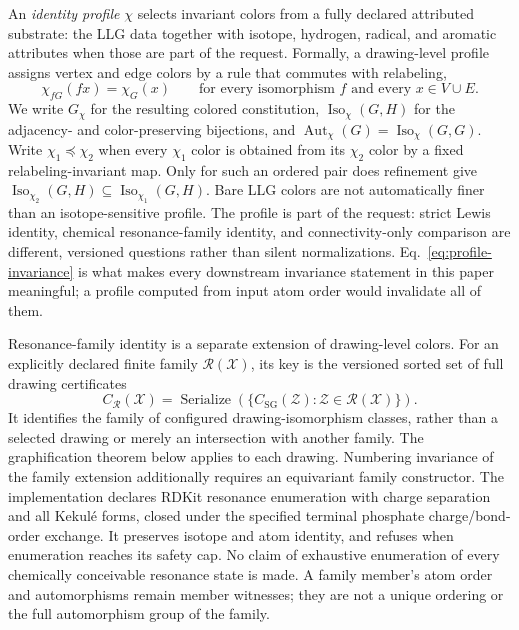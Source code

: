 \documentclass[pdflatex,sn-mathphys-num,referee,lineno]{sn-jnl}
\theoremstyle{plain}
\theoremstyle{remark}
\theoremstyle{definition}
\begin{document}
An \emph{identity profile} \(\chi\) selects invariant colors from a fully
declared attributed substrate: the LLG data together with isotope, hydrogen,
radical, and aromatic attributes when those are part of the request.  Formally,
a drawing-level profile assigns vertex and edge colors by a rule that commutes
with relabeling,
\begin{equation}
  \chi_{fG}(f x)=\chi_G(x)
  \qquad\text{for every isomorphism } f \text{ and every } x\in V\cup E .
  \label{eq:profile-invariance}
\end{equation}
We write \(G_\chi\) for the resulting colored constitution,
\(\operatorname{Iso}_\chi(G,H)\) for the adjacency- and color-preserving
bijections, and \(\operatorname{Aut}_\chi(G)=\operatorname{Iso}_\chi(G,G)\).
Write \(\chi_1\preceq\chi_2\) when every \(\chi_1\) color is obtained from its
\(\chi_2\) color by a fixed relabeling-invariant map.  Only for such an ordered
pair does refinement give
\(\operatorname{Iso}_{\chi_2}(G,H)\subseteq
\operatorname{Iso}_{\chi_1}(G,H)\).  Bare LLG colors are not automatically
finer than an isotope-sensitive profile.  The profile is part of the request:
strict Lewis identity, chemical resonance-family identity, and connectivity-only
comparison are different, versioned questions rather than silent
normalizations.  Eq.~\eqref{eq:profile-invariance} is what makes every
downstream invariance statement in this paper meaningful; a profile computed
from input atom order would invalidate all of them.

Resonance-family identity is a separate extension of drawing-level colors.
For an explicitly declared finite family \(\mathcal R(\mathcal X)\), its key is
the versioned sorted set of full drawing certificates
\[
 C_{\mathcal R}(\mathcal X)=
 \operatorname{Serialize}\!\left(
 \{C_{\mathrm{SG}}(\mathcal Z):\mathcal Z\in\mathcal R(\mathcal X)\}\right).
\]
It identifies the family of configured drawing-isomorphism classes, rather
than a selected drawing or merely an intersection with another family.
The graphification theorem below applies to each drawing. Numbering invariance
of the family extension additionally requires an equivariant family constructor.
The implementation declares RDKit resonance enumeration with charge separation
and all Kekul\'e forms, closed under the specified terminal phosphate
charge/bond-order exchange. It preserves isotope and atom identity, and refuses
when enumeration reaches its safety cap. No claim of exhaustive enumeration of
every chemically conceivable resonance state is made. A family member's atom
order and automorphisms remain member witnesses; they are not a unique ordering
or the full automorphism group of the family.
\end{document}
